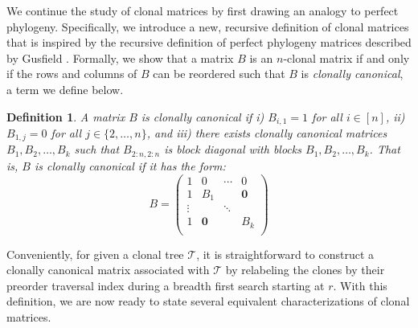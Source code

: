 \documentclass[10pt]{article}
\newtheorem{definition}{Definition}
\newcommand{\tree}{\mathcal{T}}
\begin{document}
We continue the study of clonal matrices by first drawing an analogy to perfect phylogeny. 
Specifically, we introduce a new, recursive definition
of clonal matrices that is inspired by the recursive definition of perfect
phylogeny matrices described by Gusfield \cite{gusfield_efficient_1991, peer_incomplete_2000}. Formally,
we show that a matrix $B$ is an $n$-clonal matrix if and only if
the rows and columns of $B$ can be reordered such that $B$ is \emph{clonally canonical},
a term we define below.

\begin{definition}
    A matrix $B$ is clonally canonical if i) $B_{i, 1} = 1$ for all $i \in [n]$,
    ii) $B_{1, j} = 0$ for all $j \in \{2, \ldots, n\}$, and iii) there exists 
    clonally canonical matrices $B_1, B_2, \ldots, B_k$ such that $B_{2:n , 2:n}$ is
    block diagonal with blocks $B_1, B_2, \ldots, B_k$. That is, $B$ is clonally canonical
    if it has the form:
    \[B= \left(\begin{array}{c|ccc}
        1 & 0 & \cdots & 0\\
        \hline
        1 & B_1 & & \mathbf{0} \\
        \vdots & & \ddots & \\
        1 & \mathbf{0} & & B_k \\
    \end{array}\right)\]
\end{definition}

Conveniently, for given a clonal tree $\tree$, it is straightforward to construct a clonally 
canonical matrix associated with $\tree$ by relabeling the clones by their preorder traversal 
index during a breadth first search starting at $r$. With this definition, we are now ready 
to state several equivalent characterizations of clonal matrices.
\end{document}
